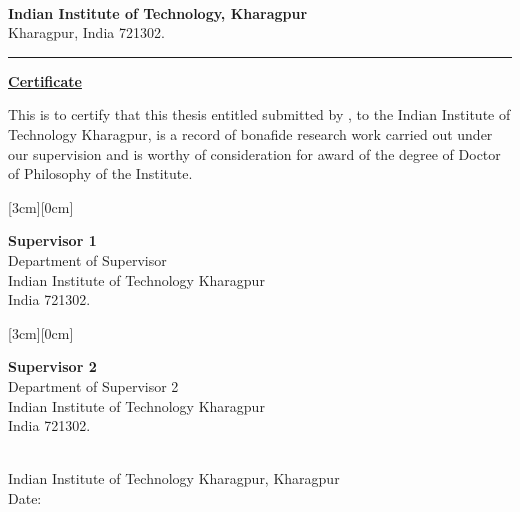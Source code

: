 \thispagestyle{empty}

\begin{figure}[htbp]
\end{figure}

\vspace*{-4.0\baselineskip}

\hspace*{2cm} {\large{\bf{\sf \authorDept}}} \\
\hspace*{2.6cm}   {\large{\bf{\sf Indian Institute of Technology, Kharagpur}}}\\
\hspace*{2.6cm}   {\large{\sf Kharagpur, India 721302.}}\\
\vspace*{0.5cm}
\rule{\textwidth}{0.75pt}

\baselineskip \centerline{\underline{\Large{\bf
Certificate}}} \baselineskip \noindent This is to
certify that this thesis entitled {\bf \thesisTitle} submitted by {\bf \authorName}, to the Indian Institute of Technology Kharagpur, is a record of bonafide research work carried out under our supervision and is worthy of consideration for award of the degree of Doctor of Philosophy of the Institute.

\begin{flushright}
\raisebox{0.1cm}[3cm][0cm]{
\begin{minipage}{7.8cm}
{\bf Supervisor 1 }\\
Department of Supervisor \\
Indian Institute of Technology Kharagpur \\
{\sf India} 721302.
\end{minipage}
}
\end{flushright}
\vspace{1cm}
\begin{flushright}
\raisebox{0.4cm}[3cm][0cm]{
\begin{minipage}{7.8cm}
{\bf Supervisor 2}\\
  Department of Supervisor 2 \\
 Indian Institute of Technology Kharagpur \\
 {\sf India} 721302.\\
\end{minipage}
}
\end{flushright}

\ \\
Indian Institute of Technology Kharagpur, Kharagpur\\
Date:
